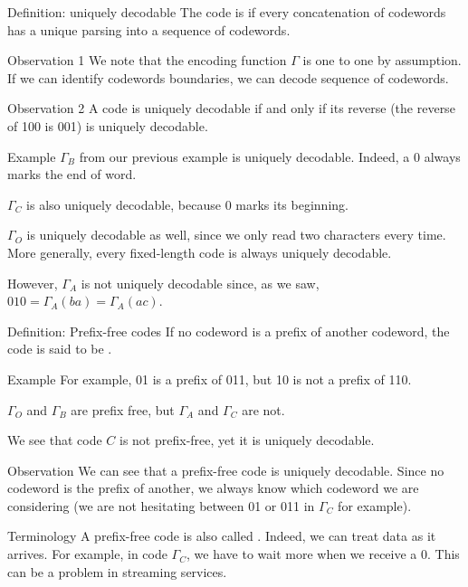 \documentclass[a4paper]{article}
\begin{document}
\begin{parag}{Definition: uniquely decodable}
    The code is  if every concatenation of codewords has a unique parsing into a sequence of codewords.

    \begin{subparag}{Observation 1}
        We note that the encoding function $\Gamma$ is one to one by assumption. If we can identify codewords boundaries, we can decode sequence of codewords.
    \end{subparag}
    
    \begin{subparag}{Observation 2}
        A code is uniquely decodable if and only if its reverse (the reverse of 100 is 001) is uniquely decodable.
    \end{subparag}
\end{parag}

\begin{parag}{Example}
    $\Gamma_B$ from our previous example is uniquely decodable. Indeed, a 0 always marks the end of word.

    $\Gamma_C$ is also uniquely decodable, because 0 marks its beginning.

    $\Gamma_O$ is uniquely decodable as well, since we only read two characters every time. More generally, every fixed-length code is always uniquely decodable.

    However, $\Gamma_A$ is not uniquely decodable since, as we saw, $010 = \Gamma_A\left(ba\right) = \Gamma_A\left(ac\right)$.
\end{parag}

\begin{parag}{Definition: Prefix-free codes}
    If no codeword is a prefix of another codeword, the code is said to be .

    \begin{subparag}{Example}
        For example, 01 is a prefix of 011, but 10 is not a prefix of 110.

        $\Gamma_O$ and $\Gamma_B$ are prefix free, but $\Gamma_A$ and $\Gamma_C$ are not.

        We see that code $C$ is not prefix-free, yet it is uniquely decodable. 
    \end{subparag}

    \begin{subparag}{Observation}
        We can see that a prefix-free code is uniquely decodable. Since no codeword is the prefix of another, we always know which codeword we are considering (we are not hesitating between 01 or 011 in $\Gamma_C$ for example).
    \end{subparag}

    \begin{subparag}{Terminology}
        A prefix-free code is also called . Indeed, we can treat data as it arrives. For example, in code $\Gamma_C$, we have to wait more when we receive a 0. This can be a problem in streaming services.
    \end{subparag}
\end{parag}
\end{document}
